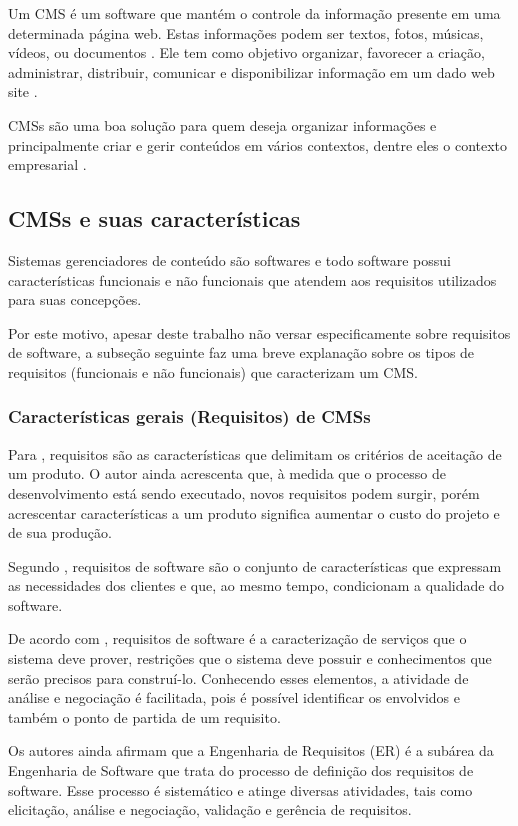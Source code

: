 Um CMS é um software que mantém o controle da informação presente em uma determinada página web. Estas informações podem ser textos, fotos, músicas, vídeos, ou documentos \cite{xiang}. Ele tem como objetivo organizar, favorecer a criação, administrar, distribuir, comunicar e disponibilizar informação em um dado web site \cite{barrere}.

CMSs são uma boa solução para quem deseja organizar informações e principalmente criar e gerir conteúdos em vários contextos, dentre eles o contexto empresarial \cite{muslu}.

\subsection{CMSs e suas características}
Sistemas gerenciadores de conteúdo são softwares e todo software possui características funcionais e não funcionais que atendem aos requisitos utilizados para suas concepções.

Por este motivo, apesar deste trabalho não versar especificamente sobre requisitos de software,
a subseção seguinte faz uma breve explanação sobre os tipos de requisitos (funcionais e não funcionais) que caracterizam um CMS.


\subsubsection{Características gerais (Requisitos) de CMSs }

Para , requisitos são as características que delimitam os critérios de aceitação de um produto. O autor ainda acrescenta que, à medida que o processo de desenvolvimento está sendo executado, novos requisitos podem surgir, porém acrescentar características a um produto significa aumentar o custo do projeto e de sua produção. 

Segundo , requisitos de software são o conjunto de características que expressam as necessidades dos clientes e que, ao mesmo tempo, condicionam a qualidade do software.

De acordo com , requisitos de software é a caracterização de serviços que o sistema deve prover, restrições que o sistema deve possuir e conhecimentos que serão precisos para construí-lo. Conhecendo esses elementos, a atividade de análise e negociação é facilitada, pois é possível identificar os envolvidos e também o ponto de partida de um requisito. 

Os autores ainda afirmam que a Engenharia de Requisitos (ER) é a subárea da Engenharia de Software que trata do processo de definição dos requisitos de software. Esse processo é sistemático e atinge diversas atividades, tais como elicitação, análise e negociação, validação e gerência de requisitos.

